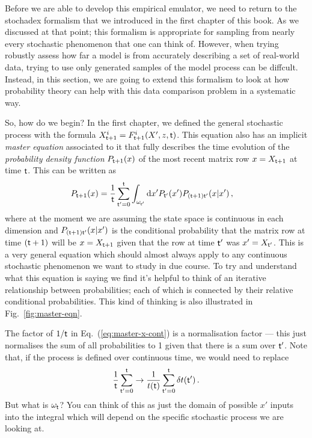 Before we are able to develop this empirical emulator, we need to return to the stochadex formalism that we introduced in the first chapter of this book. As we discussed at that point; this formalism is appropriate for sampling from nearly every stochastic phenomenon that one can think of. However, when trying robustly assess how far a model is from accurately describing a set of real-world data, trying to use only generated samples of the model process can be diffcult. Instead, in this section, we are going to extend this formalism to look at how probability theory can help with this data comparison problem in a systematic way.

So, how do we begin? In the first chapter, we defined the general stochastic process with the formula $X^{i}_{{\sf t}+1} = F^{i}_{{\sf t}+1}(X',z,{\sf t})$. This equation also has an implicit \emph{master equation} associated to it that fully describes the time evolution of the \emph{probability density function} $P_{{\sf t}+1}(x)$ of the most recent matrix row $x=X_{{\sf t}+1}$ at time ${\sf t}$. This can be written as
\begin{align}
P_{{\sf t}+1}(x) &= \frac{1}{{\sf t}}\sum_{{\sf t}'=0}^{{\sf t}}\int_{\omega_{{\sf t}'}}{\rm d}x' P_{{\sf t}'}(x') P_{({\sf t}+1){\sf t}'}(x\vert x') \label{eq:master-x-cont} \,,
\end{align}
where at the moment we are assuming the state space is continuous in each dimension and $P_{({\sf t}+1){\sf t}'}(x\vert x')$ is the conditional probability that the matrix row at time $({\sf t}+1)$ will be $x=X_{{\sf t}+1}$ given that the row at time ${\sf t}'$ was $x'=X_{{\sf t}'}$. This is a very general equation which should almost always apply to any continuous stochastic phenomenon we want to study in due course. To try and understand what this equation is saying we find it's helpful to think of an iterative relationship between probabilities; each of which is connected by their relative conditional probabilities. This kind of thinking is also illustrated in Fig.~\ref{fig:master-eqn}.

The factor of $1/{\sf t}$ in Eq.~(\ref{eq:master-x-cont}) is a normalisation factor --- this just normalises the sum of all probabilities to 1 given that there is a sum over ${\sf t}'$. Note that, if the process is defined over continuous time, we would need to replace 
\begin{align}
\frac{1}{{\sf t}}\sum_{{\sf t}'=0}^{{\sf t}} \rightarrow \frac{1}{t({\sf t})}\sum_{{\sf t}'=0}^{{\sf t}}\delta t({\sf t}') \,.
\end{align}
But what is $\omega_{\sf t}$? You can think of this as just the domain of possible $x'$ inputs into the integral which will depend on the specific stochastic process we are looking at.

